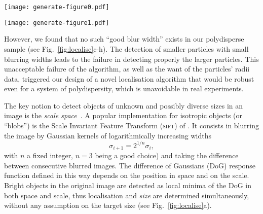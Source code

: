 \begin{figure*}
\begin{center}
\texttt{[image: generate-figure0.pdf]}
\end{center}
\caption{\textbf{Visualisation of the results of various tracking methods for the same portion of image.} \textbf{a,} Multiscale 3D tracking. \textbf{b,} Reconstruction from multiscale 2D tracking. \textbf{c-h,} Crocker and Grier in 3D with blurring radius increasing from \unit{2}{px} to \unit{4.5}{px} by steps of \unit{0.5}{px}. The circles on each picture are the result of 2D multiscale tracking of each XY slice of the 3D pictures. Sphere are displayed with radii determined by the tracking methods in \textbf{a-b}, and equal to the blurring radius for \textbf{c-h}.}
	\label{fig:localise}
\end{figure*}
\begin{figure*}
\begin{center}
\texttt{[image: generate-figure1.pdf]}
\end{center}
	\caption{\textbf{Sizing of our colloids.} \textbf{a,} Size distribution estimated \emph{in situ} (dashed line) by our multiscale algorithm ($\sim 1.7\times 10^6$ instantaneous sizing). Comparison with the size distribution estimated from \textsc{sem} of only $140$ dry particles (steps) is possible once $23\%$ of swelling of particle diameters is taken into account (full line). \textbf{b,} First peak of the radial distribution function with (full line) and without (dashed) the individual sizes data. Taking into account the measured sizes rectifies the effect of the polydispersity: the peak is thinner and higher.}
	\label{fig:sizing}
\end{figure*}

However, we found that no such ``good blur width'' exists in our polydisperse sample (see Fig.~\ref{fig:localise}c-h). The detection of smaller particles with small blurring widths leads to the failure in detecting properly the larger particles. This unacceptable failure of the \citet{Crocker1996} algorithm, as well as the want of the particles' radii data, triggered our design of a novel localisation algorithm that would be robust even for a system of polydispersity, which is unavoidable in real experiments.

The key notion to detect objects of unknown and possibly diverse sizes in an image is the \emph{scale space}~\cite{Lindeberg1993}. A popular implementation for isotropic objects (or ``blobs'') is the Scale Invariant Feature Transform (\textsc{sift}) of \citet{Lowe2004}. It consists  in blurring the image by Gaussian kernels of logarithmically increasing widths
\begin{equation}
\sigma_{i+1} = 2^{1/n} \sigma_i ,
\label{eq:sigma_i}
\end{equation}
with $n$ a fixed integer, $n=3$ being a good choice) and taking the difference between consecutive blurred images. The difference of Gaussians (DoG) response function defined in this way depends on the position in space and on the scale. Bright objects in the original image are detected as local minima of the DoG in both space and scale, thus localisation and \emph{size} are determined simultaneously, without any assumption on the target size (see Fig.~\ref{fig:localise}a).

